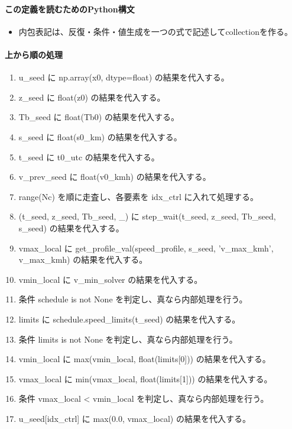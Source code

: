 \documentclass[a4paper,11pt]{article}
\begin{document}
            \paragraph{この定義を読むためのPython構文}
            \begin{itemize}[leftmargin=1.6em]
            \item 内包表記は、反復・条件・値生成を一つの式で記述してcollectionを作る。
            \end{itemize}
            \paragraph{上から順の処理}
            \begin{enumerate}[leftmargin=1.8em]
            \item u\_seed に np.array(x0, dtype=float) の結果を代入する。
\item z\_seed に float(z0) の結果を代入する。
\item Tb\_seed に float(Tb0) の結果を代入する。
\item s\_seed に float(s0\_km) の結果を代入する。
\item t\_seed に t0\_utc の結果を代入する。
\item v\_prev\_seed に float(v0\_kmh) の結果を代入する。
\item range(Nc) を順に走査し、各要素を idx\_ctrl に入れて処理する。
\item   (t\_seed, z\_seed, Tb\_seed, \_) に step\_wait(t\_seed, z\_seed, Tb\_seed, s\_seed) の結果を代入する。
\item   vmax\_local に get\_profile\_val(speed\_profile, s\_seed, 'v\_max\_kmh', v\_max\_kmh) の結果を代入する。
\item   vmin\_local に v\_min\_solver の結果を代入する。
\item   条件 schedule is not None を判定し、真なら内部処理を行う。
\item     limits に schedule.speed\_limits(t\_seed) の結果を代入する。
\item     条件 limits is not None を判定し、真なら内部処理を行う。
\item       vmin\_local に max(vmin\_local, float(limits[0])) の結果を代入する。
\item       vmax\_local に min(vmax\_local, float(limits[1])) の結果を代入する。
\item   条件 vmax\_local < vmin\_local を判定し、真なら内部処理を行う。
\item     u\_seed[idx\_ctrl] に max(0.0, vmax\_local) の結果を代入する。

\end{enumerate}
\end{document}
